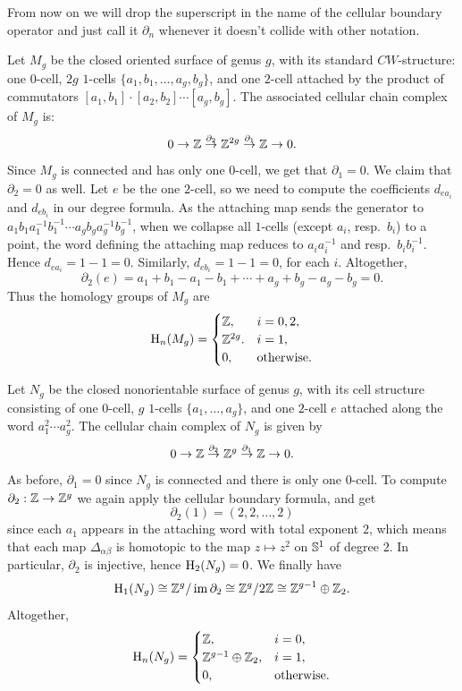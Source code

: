 From now on we will drop the superscript in the name of the cellular boundary operator and just call it $\partial_n$ whenever it doesn't collide with other notation.


\begin{example}
    Let $M_g$ be the closed oriented surface of genus $g$, with its standard $CW$-structure: one $0$-cell, $2g$ $1$-cells $\{a_1,b_1,\ldots,a_g,b_g\}$, and one $2$-cell attached by the product of commutators $[a_1,b_1]\cdot[a_2,b_2]\cdots [a_g,b_g]$. The associated cellular chain complex of $M_g$ is:
    \[0\to \mathbb{Z} \overset{\partial_2}{\to}\mathbb{Z}^{2g}\overset{\partial_1}{\to}\mathbb{Z} \to 0.\]
    Since $M_g$ is connected and has only one $0$-cell, we get that $\partial_1=0$. We claim that $\partial_2=0$ as well. Let $e$ be the one $2$-cell, so we need to compute the coefficients $d_{ea_i}$ and $d_{eb_i}$ in our degree formula. As the attaching map sends the generator to $a_1b_1a_1^{-1}b_1^{-1}\cdots a_gb_ga_g^{-1}b_g^{-1}$, when we collapse all $1$-cells (except $a_i$, resp.~$b_i$) to a point, the word defining the attaching map reduces to $a_ia_i^{-1}$ and resp.~$b_ib_i^{-1}$. Hence $d_{ea_i}=1-1=0$. Similarly, $d_{eb_i}=1-1=0$, for each $i$. Altogether,
    \[\partial_2(e)=a_1+b_1-a_1-b_1+\cdots +a_g+b_g-a_g-b_g=0.\]
    Thus the homology groups of $M_g$ are
    \[\mathrm{H}_n(M_g)=\begin{cases}
        \mathbb{Z}, &i=0,2,\\
        \mathbb{Z}^{2g}.& i=1,\\
        0,&\text{otherwise}.
    \end{cases}\]
\end{example}

\begin{example}
    Let $N_g$ be the closed nonorientable surface of genus $g$, with its cell structure consisting of one $0$-cell, $g$ $1$-cells $\{a_1,\ldots,a_g\}$, and one $2$-cell $e$ attached along the word $a_1^2\cdots a_g^2$. The cellular chain complex of $N_g$ is given by
    \[0\to\mathbb{Z} \overset{\partial_2}{\to}\mathbb{Z}^g\overset{\partial_1}{\to}\mathbb{Z} \to 0.\]
    As before, $\partial_1=0$ since $N_g$ is connected and there is only one $0$-cell. To compute $\partial_2:\mathbb{Z}\to \mathbb{Z}^g$ we again apply the cellular boundary formula, and get 
    \[\partial_2(1)=(2,2,\ldots,2)\]
    since each $a_1$ appears in the attaching word with total exponent $2$, which means that each map $\Delta_{\alpha\beta}$ is homotopic to the map $z\mapsto z^2$ on $\mathbb{S}^1$ of degree $2$. In particular, $\partial_2$ is injective, hence $\mathrm{H}_2(N_g)=0$. We finally have
    \[\mathrm{H}_1(N_g)\cong \mathbb{Z}^g\slash\operatorname{im} \partial_2\cong \mathbb{Z}^g\slash 2\mathbb{Z}\cong \mathbb{Z}^{g-1}\oplus \mathbb{Z}_2.\]
    Altogether,
    \[\mathrm{H}_n(N_g)=\begin{cases}
        \mathbb{Z},&i=0,\\
        \mathbb{Z}^{g-1}\oplus\mathbb{Z}_2,&i=1,\\
        0,&\text{otherwise}.
    \end{cases}\]
\end{example}

